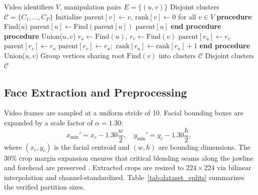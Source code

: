 \documentclass[conference]{IEEEtran}
\begin{document}
\begin{algorithm}[!t]
\caption{Disjoint-Set Union-Find for Identity Isolation}
\label{alg:union_find}
\begin{algorithmic}[1]
\REQUIRE Video identifiers $V$, manipulation pairs $E = \{(u,v)\}$
\ENSURE Disjoint clusters $\mathcal{C} = \{C_1, \ldots, C_P\}$
\STATE Initialize $\text{parent}[v] \gets v$, $\text{rank}[v] \gets 0$ for all $v \in V$
\STATE \textbf{procedure} Find($u$)
    \STATE $\text{parent}[u] \gets \text{Find}(\text{parent}[u])$ 
\ENDIF
\RETURN $\text{parent}[u]$
\STATE \textbf{end procedure}
\STATE \textbf{procedure} Union($u, v$)
\STATE $r_u \gets \text{Find}(u)$, $r_v \gets \text{Find}(v)$
        \STATE $\text{parent}[r_u] \gets r_v$
        \STATE $\text{parent}[r_v] \gets r_u$
    \ELSE
        \STATE $\text{parent}[r_v] \gets r_u$;\ $\text{rank}[r_u] \gets \text{rank}[r_u] + 1$
    \ENDIF
\ENDIF
\STATE \textbf{end procedure}
 \STATE Union($u, v$) \ENDFOR
\STATE Group vertices sharing root $\text{Find}(v)$ into clusters $\mathcal{C}$
\RETURN Disjoint clusters $\mathcal{C}$
\end{algorithmic}
\end{algorithm}

\subsection{Face Extraction and Preprocessing}

Video frames are sampled at a uniform stride of 10. Facial bounding boxes are expanded by a scale factor of $\alpha = 1.30$:
\begin{equation}
x_{\text{min}}' = x_c - 1.30 \frac{w}{2}, \quad y_{\text{min}}' = y_c - 1.30 \frac{h}{2},
\end{equation}
where $(x_c, y_c)$ is the facial centroid and $(w, h)$ are bounding dimensions. The 30\% crop margin expansion ensures that critical blending seams along the jawline and forehead are preserved \cite{shiohara2022sbi}. Extracted crops are resized to $224 \times 224$ via bilinear interpolation and channel-standardized. Table~\ref{tab:dataset_splits} summarizes the verified partition sizes.
\end{document}
